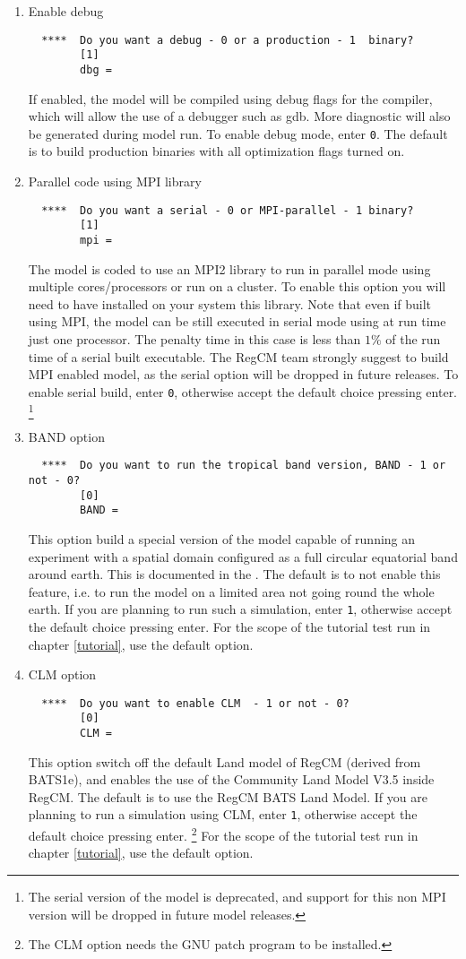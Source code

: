 \begin{enumerate}
\item Enable debug
\begin{Verbatim}
  ****  Do you want a debug - 0 or a production - 1  binary?
        [1]
        dbg =
\end{Verbatim}
If enabled, the model will be compiled using debug flags for the compiler,
which will allow the use of a debugger such as gdb. More diagnostic will
also be generated during model run. To enable debug mode, enter \verb=0=.
The default is to build production binaries with all optimization flags
turned on.
\item Parallel code using MPI library
\begin{Verbatim}
  ****  Do you want a serial - 0 or MPI-parallel - 1 binary?
        [1]
        mpi =
\end{Verbatim}
The model is coded to use an MPI2 library to run in parallel mode using
multiple cores/processors or run on a cluster. To enable this option you
will need to have installed on your system this library. Note that even
if built using MPI, the model can be still executed in serial mode using
at run time just one processor. The penalty time in this case is less than
$1\%$ of the run time of a serial built executable. The RegCM team
strongly suggest to build MPI enabled model, as the serial option will be
dropped in future releases. To enable serial build, enter \verb=0=, otherwise
accept the default choice pressing enter. \footnote{The serial version of the
model is deprecated, and support for this non MPI version will be dropped in
future model releases.}
\item BAND option
\begin{Verbatim}
  ****  Do you want to run the tropical band version, BAND - 1 or not - 0?
        [0]
        BAND =
\end{Verbatim}
This option build a special version of the model capable of running an
experiment with a spatial domain configured as a full circular equatorial
band around earth. This is documented in the \cite{refman_11}.
The default is to not enable this feature, i.e. to run the model on a limited
area not going round the whole earth. If you are planning to run such a
simulation, enter \verb=1=, otherwise accept the default choice pressing enter.
For the scope of the tutorial test run in chapter \ref{tutorial}, use the
default option.
\item CLM option
\begin{Verbatim}
  ****  Do you want to enable CLM  - 1 or not - 0? 
        [0]
        CLM =
\end{Verbatim}
This option switch off the default Land model of RegCM (derived from BATS1e),
and enables the use of the Community Land Model V3.5 inside RegCM. The default
is to use the RegCM BATS Land Model. If you are planning to run a simulation
using CLM, enter \verb=1=, otherwise accept the default choice pressing enter.
\footnote{The CLM option needs the GNU patch program to be installed.}
For the scope of the tutorial test run in chapter \ref{tutorial}, use the
default option.
\end{enumerate}

